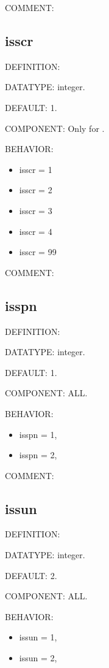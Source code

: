 {\color{olive}COMMENT:}

\subsection{isscr}
{\color{red}DEFINITION:}

{\color{green}DATATYPE:} integer.

{\color{blue}DEFAULT:} 1.

{\color{brown}COMPONENT:} Only for {\narcissus}.

{\color{purple}BEHAVIOR:}
\begin{itemize}
\item isscr = 1
\item isscr = 2
\item isscr = 3
\item isscr = 4
\item isscr = 99
\end{itemize}

{\color{olive}COMMENT:}

\subsection{isspn}
{\color{red}DEFINITION:}

{\color{green}DATATYPE:} integer.

{\color{blue}DEFAULT:} 1.

{\color{brown}COMPONENT:} ALL.

{\color{purple}BEHAVIOR:}
\begin{itemize}
\item isspn = 1,
\item isspn = 2,
\end{itemize}

{\color{olive}COMMENT:}

\subsection{issun}
{\color{red}DEFINITION:}

{\color{green}DATATYPE:} integer.

{\color{blue}DEFAULT:} 2.

{\color{brown}COMPONENT:} ALL.

{\color{purple}BEHAVIOR:}
\begin{itemize}
\item issun = 1,
\item issun = 2,
\end{itemize}

